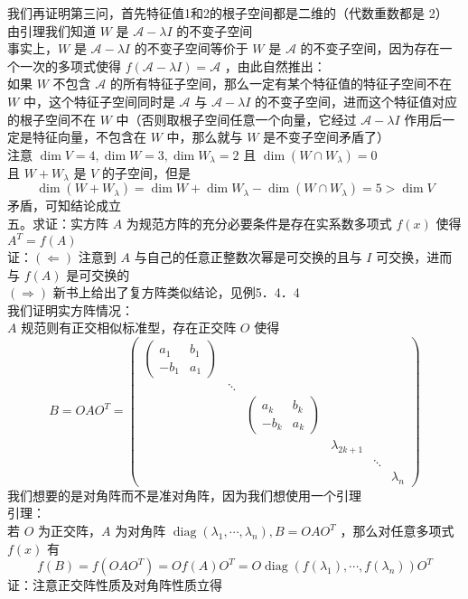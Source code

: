 \documentclass[UTF8]{ctexart}
\begin{document}
\noindent 我们再证明第三问，首先特征值1和2的根子空间都是二维的（代数重数都是 2）\\
由引理我们知道 $W$ 是 $\mathcal{A}-\lambda I$ 的不变子空间\\
事实上，$W$ 是 $\mathcal{A}-\lambda I$ 的不变子空间等价于 $W$ 是 $\mathcal{A}$ 的不变子空间，因为存在一个一次的多项式使得 $f(\mathcal{A}-\lambda I)=\mathcal{A}$ ，由此自然推出：\\
如果 $W$ 不包含 $\mathcal{A}$ 的所有特征子空间，那么一定有某个特征值的特征子空间不在 $W$ 中，这个特征子空间同时是 $\mathcal{A}$ 与 $\mathcal{A}-\lambda I$ 的不变子空间，进而这个特征值对应的根子空间不在 $W$ 中（否则取根子空间任意一个向量，它经过 $\mathcal{A}-\lambda I$ 作用后一定是特征向量，不包含在 $W$ 中，那么就与 $W$ 是不变子空间矛盾了）\\
注意 $\operatorname{dim} V=4, \operatorname{dim} W=3, \operatorname{dim} W_{\lambda}=2$ 且 $\operatorname{dim}\left(W \cap W_{\lambda}\right)=0$\\
且 $W+W_{\lambda}$ 是 $V$ 的子空间，但是
$$\operatorname{dim}\left(W+W_{\lambda}\right)=\operatorname{dim} W+\operatorname{dim} W_{\lambda}-\operatorname{dim}\left(W \cap W_{\lambda}\right)=5>\operatorname{dim} V$$
矛盾，可知结论成立\\



\noindent 五。求证：实方阵 $A$ 为规范方阵的充分必要条件是存在实系数多项式 $f(x)$ 使得 $A^{T}=f(A)$\\
证：$(\Leftarrow)$ 注意到 $A$ 与自己的任意正整数次幂是可交换的且与 $I$ 可交换，进而与 $f(A)$ 是可交换的\\
$(\Rightarrow)$ 新书上给出了复方阵类似结论，见例5．4．4\\
我们证明实方阵情况：\\
$A$ 规范则有正交相似标准型，存在正交阵 $O$ 使得\\
$$B = O A O^{T} = \left(\begin{array}{cccccc}
	\left(\begin{array}{cc} a_{1} & b_{1} \\ -b_{1} & a_{1} \end{array}\right) & & & & & \\
	& \ddots & & & & \\
	& & \left(\begin{array}{cc} a_{k} & b_{k} \\ -b_{k} & a_{k} \end{array}\right) & & & \\
	& & & \lambda_{2k+1} & & \\
	& & & & \ddots & \\
	& & & & & \lambda_{n}
\end{array}\right)$$
我们想要的是对角阵而不是准对角阵，因为我们想使用一个引理\\
引理：\\
若 $O$ 为正交阵，$A$ 为对角阵 $\operatorname{diag}\left(\lambda_{1}, \cdots, \lambda_{n}\right), B=O A O^{T}$ ，那么对任意多项式 $f(x)$ 有
$$f(B)=f\left(O A O^{T}\right)=O f(A) O^{T}=O \operatorname{diag}\left(f\left(\lambda_{1}\right), \cdots, f\left(\lambda_{n}\right)\right) O^{T}$$
证：注意正交阵性质及对角阵性质立得\\
\end{document}
